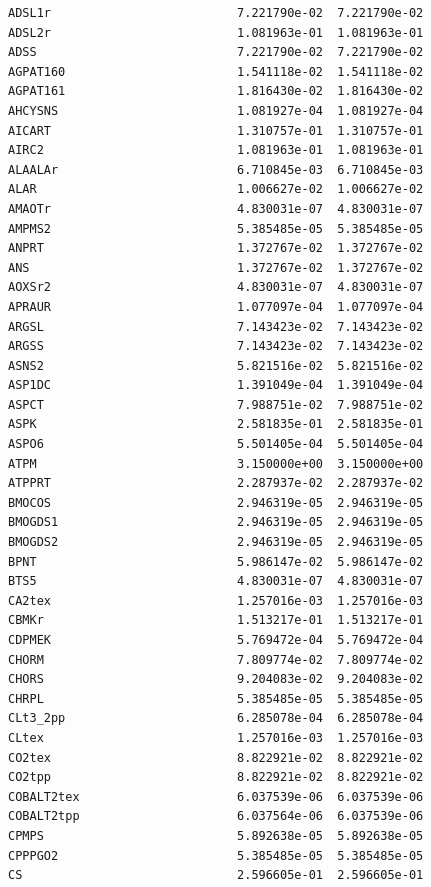 \documentclass{scrartcl}
\begin{document}
\begin{enumerate}
\begin{lstlisting}
ADSL1r                          7.221790e-02  7.221790e-02
ADSL2r                          1.081963e-01  1.081963e-01
ADSS                            7.221790e-02  7.221790e-02
AGPAT160                        1.541118e-02  1.541118e-02
AGPAT161                        1.816430e-02  1.816430e-02
AHCYSNS                         1.081927e-04  1.081927e-04
AICART                          1.310757e-01  1.310757e-01
AIRC2                           1.081963e-01  1.081963e-01
ALAALAr                         6.710845e-03  6.710845e-03
ALAR                            1.006627e-02  1.006627e-02
AMAOTr                          4.830031e-07  4.830031e-07
AMPMS2                          5.385485e-05  5.385485e-05
ANPRT                           1.372767e-02  1.372767e-02
ANS                             1.372767e-02  1.372767e-02
AOXSr2                          4.830031e-07  4.830031e-07
APRAUR                          1.077097e-04  1.077097e-04
ARGSL                           7.143423e-02  7.143423e-02
ARGSS                           7.143423e-02  7.143423e-02
ASNS2                           5.821516e-02  5.821516e-02
ASP1DC                          1.391049e-04  1.391049e-04
ASPCT                           7.988751e-02  7.988751e-02
ASPK                            2.581835e-01  2.581835e-01
ASPO6                           5.501405e-04  5.501405e-04
ATPM                            3.150000e+00  3.150000e+00
ATPPRT                          2.287937e-02  2.287937e-02
BMOCOS                          2.946319e-05  2.946319e-05
BMOGDS1                         2.946319e-05  2.946319e-05
BMOGDS2                         2.946319e-05  2.946319e-05
BPNT                            5.986147e-02  5.986147e-02
BTS5                            4.830031e-07  4.830031e-07
CA2tex                          1.257016e-03  1.257016e-03
CBMKr                           1.513217e-01  1.513217e-01
CDPMEK                          5.769472e-04  5.769472e-04
CHORM                           7.809774e-02  7.809774e-02
CHORS                           9.204083e-02  9.204083e-02
CHRPL                           5.385485e-05  5.385485e-05
CLt3_2pp                        6.285078e-04  6.285078e-04
CLtex                           1.257016e-03  1.257016e-03
CO2tex                          8.822921e-02  8.822921e-02
CO2tpp                          8.822921e-02  8.822921e-02
COBALT2tex                      6.037539e-06  6.037539e-06
COBALT2tpp                      6.037564e-06  6.037539e-06
CPMPS                           5.892638e-05  5.892638e-05
CPPPGO2                         5.385485e-05  5.385485e-05
CS                              2.596605e-01  2.596605e-01

\end{lstlisting}
\end{enumerate}
\end{document}
